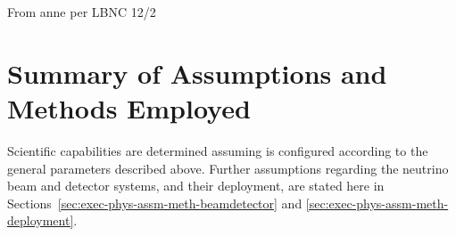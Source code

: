 \begin{comment}
\textit{\lartpc technology for far detector modules}
    Combining intrinsic scalability with high-performance event 
    imaging, calorimetry and particle identification capabilities, 
    the concept of large \dword{lartpc} detectors was developed 
    for the broad underground science program of \dword{dune}.  This design choice integrates well with the
    other basic design elements described above.
    For example, the
    excellent neutrino energy reconstruction capability
    of \dwords{lartpc} 
    is especially important for the long-baseline program with a 
    wide-band neutrino beam.
    Additionally, the choice of \dword{lartpc} technology provides 
    valuable complementarity to other 
    existing and planned detectors pursuing many
    of the same goals.  As an example of this complementarity,
    the sensitivity of \dword{dune} to the \nue component of supernova 
    neutrino flux, prevalent in the neutronization phase of the 
    explosion, provides distinct information relative to that 
    provided by water or organic scintillator-based detectors in 
    which \anue interactions dominate.  

The scientific basis for the above foundational experimental
design choices has been examined and validated through extensive
review, undertaken at all stages of \dword{dune} development.
Recent experimental and theoretical developments have only
strengthened the scientific case for \dword{dune} and its
basic configuration.  The technical underpinnings for
these choices have also been strengthened over time through a worldwide
program of R\&D and engineering development, as described in a suite
of \dword{lbnf-dune} project documents including this \dword{tdr}, as
well as in sources describing independent experiments and development
activities.
\end{comment}  From anne per LBNC 12/2

\section{Summary of Assumptions and Methods Employed}
\label{sec:exec-phys-assm-meth}

Scientific capabilities are determined assuming 
is configured according to the general parameters described above.
Further assumptions regarding the neutrino beam and detector 
systems, and their deployment, are stated here in
Sections~\ref{sec:exec-phys-assm-meth-beamdetector} and
\ref{sec:exec-phys-assm-meth-deployment}. 

